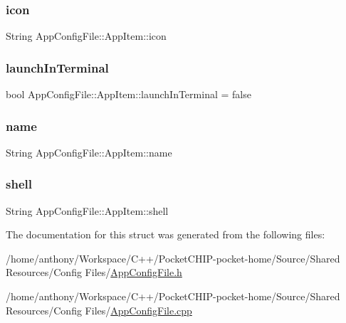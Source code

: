 \subsubsection{\texorpdfstring{icon}{icon}}
{\footnotesize\ttfamily String App\+Config\+File\+::\+App\+Item\+::icon}

\mbox{\label{structAppConfigFile_1_1AppItem_a378ce5972f077ca6c5a2a3c6986ce16f}} 
\subsubsection{\texorpdfstring{launch\+In\+Terminal}{launchInTerminal}}
{\footnotesize\ttfamily bool App\+Config\+File\+::\+App\+Item\+::launch\+In\+Terminal = false}

\mbox{\label{structAppConfigFile_1_1AppItem_aeaf1017ffc17a97da64da86187468597}} 
\subsubsection{\texorpdfstring{name}{name}}
{\footnotesize\ttfamily String App\+Config\+File\+::\+App\+Item\+::name}

\mbox{\label{structAppConfigFile_1_1AppItem_aff5793aa12da18b14753f9647e627f39}} 
\subsubsection{\texorpdfstring{shell}{shell}}
{\footnotesize\ttfamily String App\+Config\+File\+::\+App\+Item\+::shell}



The documentation for this struct was generated from the following files\+:\begin{DoxyCompactItemize}
\item 
/home/anthony/\+Workspace/\+C++/\+Pocket\+C\+H\+I\+P-\/pocket-\/home/\+Source/\+Shared Resources/\+Config Files/\mbox{\hyperlink{AppConfigFile_8h}{App\+Config\+File.\+h}}\item 
/home/anthony/\+Workspace/\+C++/\+Pocket\+C\+H\+I\+P-\/pocket-\/home/\+Source/\+Shared Resources/\+Config Files/\mbox{\hyperlink{AppConfigFile_8cpp}{App\+Config\+File.\+cpp}}\end{DoxyCompactItemize}
